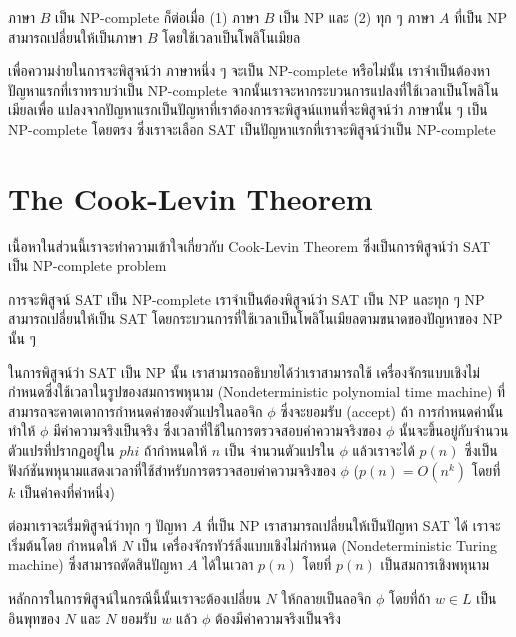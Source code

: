 \par{
ภาษา $B$ เป็น NP-complete ก็ต่อเมื่อ (1) ภาษา $B$ เป็น NP และ (2)
ทุก ๆ ภาษา $A$ ที่เป็น NP สามารถเปลี่ยนให้เป็นภาษา $B$ โดยใช้เวลาเป็นโพลิโนเมียล
}

\par{
เพื่อความง่ายในการจะพิสูจน์ว่า ภาษาหนึ่ง ๆ จะเป็น NP-complete หรือไม่นั้น เราจำเป็นต้องหา ปัญหาแรกที่เราทราบว่าเป็น NP-complete จากนั้นเราจะหากระบวนการแปลงที่ใช้เวลาเป็นโพลิโนเมียลเพื่อ แปลงจากปัญหาแรกเป็นปัญหาที่เราต้องการจะพิสูจน์แทนที่จะพิสูจน์ว่า ภาษานั้น ๆ เป็น NP-complete โดยตรง ซึ่งเราจะเลือก SAT เป็นปัญหาแรกที่เราจะพิสูจน์ว่าเป็น NP-complete
}

\section{The Cook-Levin Theorem}

\par{เนื้อหาในส่วนนี้เราจะทำความเข้าใจเกี่ยวกับ Cook-Levin Theorem ซึ่งเป็นการพิสูจน์ว่า SAT เป็น NP-complete problem}

\par{
การจะพิสูจน์ SAT เป็น NP-complete เราจำเป็นต้องพิสูจน์ว่า SAT เป็น NP และทุก ๆ NP สามารถเปลี่ยนให้เป็น SAT โดยกระบวนการที่ใช้เวลาเป็นโพลิโนเมียลตามขนาดของปัญหาของ NP นั้น ๆ 
}

\par{
ในการพิสูจน์ว่า SAT เป็น NP นั้น เราสามารถอธิบายได้ว่าเราสามารถใช้ เครื่องจักรแบบเชิงไม่กำหนดซึ่งใช้เวลาในรูปของสมการพหุนาม (Nondeterministic polynomial time machine) ที่สามารถจะคาดเดาการกำหนดค่าของตัวแปรในลอจิก $\phi$ ซึ่งจะยอมรับ (accept) ถ้า การกำหนดค่านั้นทำให้ $\phi$ มีค่าความจริงเป็นจริง ซึ่งเวลาที่ใช้ในการตรวจสอบค่าความจริงของ $\phi$ นั้นจะขึ้นอยู่กับจำนวนตัวแปรที่ปรากฏอยู่ใน $phi$ ถ้ากำหนดให้ $n$ เป็น จำนวนตัวแปรใน $\phi$ แล้วเราจะได้ $p(n)$ ซึ่งเป็นฟังก์ชันพหุนามแสดงเวลาที่ใช้สำหรับการตรวจสอบค่าความจริงของ $\phi$ ($p(n) = O(n^k)$ โดยที่ $k$ เป็นค่าคงที่ค่าหนึ่ง)
}

\par{
ต่อมาเราจะเริ่มพิสูจน์ว่าทุก ๆ ปัญหา $A$ ที่เป็น NP เราสามารถเปลี่ยนให้เป็นปัญหา SAT ได้ เราจะเริ่มต้นโดย กำหนดให้ $N$ เป็น เครื่องจักรทัวร์ลิ่งแบบเชิงไม่กำหนด (Nondeterministic Turing machine) ซึ่งสามารถตัดสินปัญหา $A$ ได้ในเวลา $p(n)$ โดยที่ $p(n)$ เป็นสมการเชิงพหุนาม
}

\par{
หลักการในการพิสูจน์ในกรณีนี้นั้นเราจะต้องเปลี่ยน $N$ ให้กลายเป็นลอจิก $\phi$ โดยที่ถ้า $w \in L$ เป็นอินพุทของ $N$ และ $N$ ยอมรับ $w$ แล้ว $\phi$ ต้องมีค่าความจริงเป็นจริง 
}

